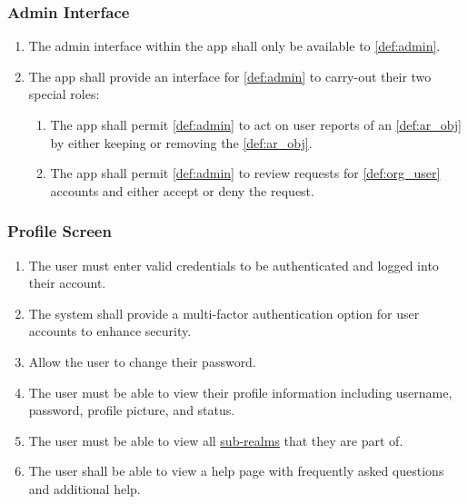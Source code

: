 \documentclass{article}
\begin{document}
\subsubsection{Admin Interface}
\label{ssub:admin_interface}

\begin{enumerate}[align=left, label=\textbf{AI-FR\arabic*:}]
    \item The admin interface within the app shall only be available to \ref{def:admin}.
    \item The app shall provide an interface for \ref{def:admin} to carry-out their two special roles:
          \begin{enumerate}[align=left, label=\textbf{AI-FR2.\arabic*:}]
              \item The app shall permit \ref{def:admin} to act on user reports of an \ref{def:ar_obj} by either keeping or removing the \ref{def:ar_obj}.
              \item The app shall permit \ref{def:admin} to review requests for \ref{def:org_user} accounts and either accept or deny the request.
          \end{enumerate}
\end{enumerate}

\subsubsection{Profile Screen}
\label{ssub:profile_screen}
\begin{enumerate}[align=left, label=\textbf{PS-FR\arabic*:}]
    \item The user must enter valid credentials to be authenticated and logged into their account.
    \item The system shall provide a multi-factor authentication option for user accounts to enhance security. \\
    \item Allow the user to change their password.
    \item The user must be able to view their profile information including username, password, profile picture, and status.
    \item The user must be able to view all \hyperref[def:sub_realm]{sub-realms} that they are part of.
    \item The user shall be able to view a help page with frequently asked questions and additional help.
\end{enumerate}
\end{document}

